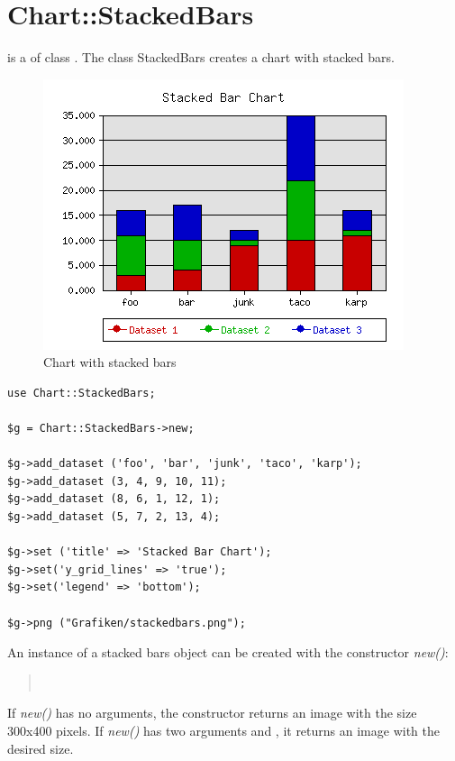 %
%
\section{Chart::StackedBars}
\begin{Description} 
 is a  of class .
The class StackedBars creates a chart with stacked bars.
\end{Description}


\begin{figure}[h]
	\begin{center}
		\includegraphics[scale=0.6]{stackedbars.png}
	\end{center}
	\caption{Chart with stacked bars}
	\label{fig:stackedbars}
\end{figure}
\begin{verbatim}
use Chart::StackedBars;

$g = Chart::StackedBars->new;

$g->add_dataset ('foo', 'bar', 'junk', 'taco', 'karp');
$g->add_dataset (3, 4, 9, 10, 11);
$g->add_dataset (8, 6, 1, 12, 1);
$g->add_dataset (5, 7, 2, 13, 4);

$g->set ('title' => 'Stacked Bar Chart');
$g->set('y_grid_lines' => 'true');
$g->set('legend' => 'bottom');

$g->png ("Grafiken/stackedbars.png");
\end{verbatim}

\begin{Constructor} An instance of a stacked bars object can be created with the constructor
\textit{new()}:
\begin{quote}
\\
\end{quote}
If \textit{new()} has no arguments, 
the constructor returns an image with the size 300x400 pixels. 
If \textit{new()} has two arguments  and ,
it returns an image with the desired size.
\end{Constructor}

